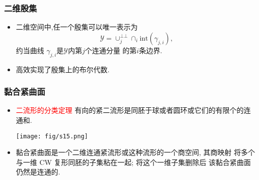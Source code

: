 \documentclass[UTF8]{ctexbeamer}	%
\theoremstyle{plain}
\theoremstyle{definition}
\theoremstyle{remark}
\numberwithin{equation}{section}
\begin{document}
\begin{frame}
    \frametitle{二维殷集}
    \begin{itemize}
        \item 二维空间中,任一个殷集可以唯一表示为
              \[\mathcal{Y} = \cup_j^{\bot \bot}\cap_i \text{int}(\gamma_{j, i} ),\]
              约当曲线 $\gamma_{j, i}$是$\mathcal{Y}$内第$j$个连通分量
              的第$i$条边界.
        \item 高效实现了殷集上的布尔代数.
    \end{itemize}
    \begin{figure}[!htb]
        \centering
    \end{figure}
\end{frame}

\begin{frame}
    \frametitle{黏合紧曲面}
    \begin{itemize}
        \item
              \textcolor{red}{二流形的分类定理} \newline
              有向的紧二流形是同胚于球或者圆环或它们的有限个的连通和.
              \begin{center}
                  \texttt{[image: fig/s15.png]}
              \end{center}


        \item 黏合紧曲面是一个二维连通紧流形或这种流形的一个商空间, 其商映射
              将多个与一维 CW 复形同胚的子集粘在一起; 将这个一维子集删除后
              该黏合紧曲面仍然是连通的.
    \end{itemize}
\end{frame}
\end{document}
